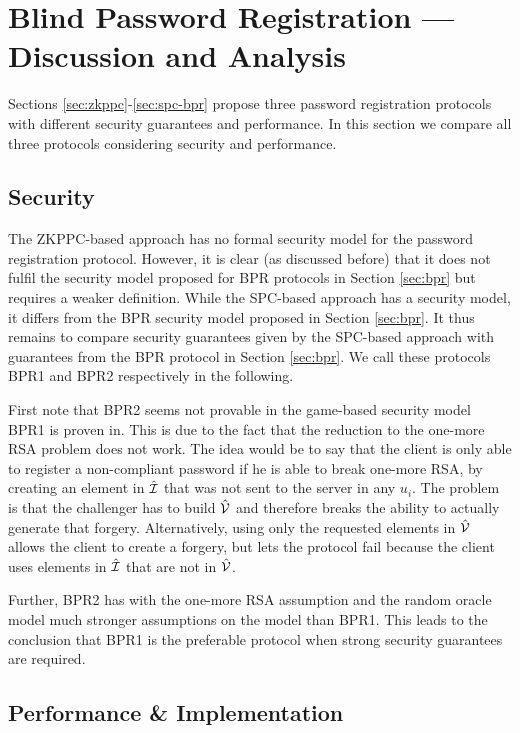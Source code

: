 \section{Blind Password Registration --- Discussion and Analysis} \label{sec:discussion}

Sections \ref{sec:zkppc}-\ref{sec:spc-bpr} propose three password registration protocols with different security guarantees and performance.
In this section we compare all three protocols considering security and performance.

\subsection{Security} \label{sec:bpr-security-analysis}
The \ac{ZKPPC}-based approach has no formal security model for the password registration protocol.
However, it is clear (as discussed before) that it does not fulfil the security model proposed for \ac{BPR} protocols in Section \ref{sec:bpr} but requires a weaker definition.
While the \ac{SPC}-based approach has a security model, it differs from the \ac{BPR} security model proposed in Section \ref{sec:bpr}.
It thus remains to compare security guarantees given by the \ac{SPC}-based approach with guarantees from the \ac{BPR} protocol in Section \ref{sec:bpr}.
We call these protocols BPR1 and BPR2 respectively in the following.

First note that BPR2 seems not provable in the game-based security model BPR1 is proven in.
This is due to the fact that the reduction to the one-more RSA problem does not work.
The idea would be to say that the client is only able to register a non-compliant password if he is able to break one-more RSA, \ie by creating an
element in $\hat{\mathcal{I}}$ that was not sent to the server in any $u_i$. 
The problem is that the challenger has to build $\hat{\mathcal{V}}$ and therefore breaks the ability to actually generate that forgery. 
Alternatively, using only the requested elements in $\hat{\mathcal{V}}$ allows the client to create a forgery, but lets the protocol fail because the client uses elements in $\hat{\mathcal{I}}$ that are not in $\hat{\mathcal{V}}$.

Further, BPR2 has with the one-more RSA assumption and the random oracle model much stronger assumptions on the model than BPR1.
This leads to the conclusion that BPR1 is the preferable protocol when strong security guarantees are required.

\subsection{Performance \& Implementation} \label{sec:performance}

